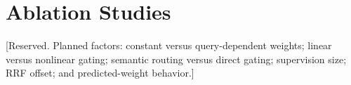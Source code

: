 \section{Ablation Studies}

[Reserved. Planned factors: constant versus query-dependent weights; linear versus nonlinear gating; semantic routing versus direct gating; supervision size; RRF offset; and predicted-weight behavior.]

